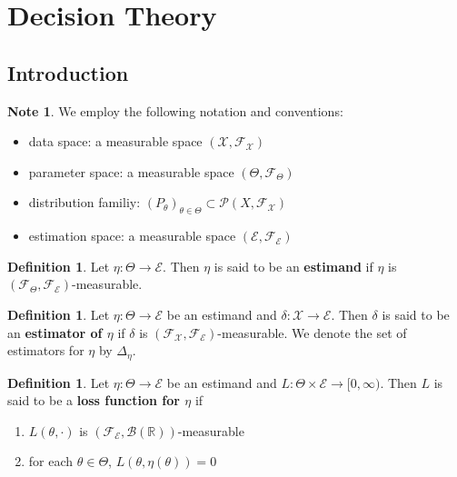 \documentclass[12pt]{amsart}
\theoremstyle{definition}
\newtheorem{defn}[definition]{Definition}
\newtheorem{note}[definition]{Note}
\newcommand{\del}{\delta}
\newcommand{\Del}{\Delta}
\newcommand{\R}{\mathbb{R}}
\newcommand{\MB}{\mathcal{B}}
\newcommand{\MF}{\mathcal{F}}
\newcommand{\MP}{\mathcal{P}}
\newcommand{\ME}{\mathcal{E}}
\newcommand{\MX}{\mathcal{X}}
\newcommand{\Rg}{[0,\infty)}
\begin{document}
	
	
	
	
	
	
	
	
	
	
	
	
	
	
	
	
	
	
	
	
	
	
	
		\newpage
	\section{Decision Theory}
	
	\subsection{Introduction}
	
	\begin{note} We employ the following notation and conventions:
		\begin{itemize}
			\item data space: a measurable space $(\MX, \MF_{\MX})$
			\item parameter space: a measurable space $(\Theta, \MF_{\Theta})$
			\item distribution familiy: $(P_{\theta})_{\theta \in \Theta} \subset \MP(X, \MF_{\MX})$
			\item estimation space: a measurable space $(\ME, \MF_{\ME})$
		\end{itemize}
	\end{note}

	\begin{defn}
		Let $\eta: \Theta \rightarrow \ME$. Then $\eta$ is said to be an \textbf{estimand} if $\eta$ is $(\MF_{\Theta}, \MF_{\ME})$-measurable. 
	\end{defn}
	
	\begin{defn}
		Let $\eta: \Theta \rightarrow \ME$ be an estimand and $\del: \MX \rightarrow \ME$. Then $\del$ is said to be an \textbf{estimator of $\eta$} if $\del$ is $(\MF_{\MX}, \MF_{\ME})$-measurable. We denote the set of estimators for $\eta$ by $\Del_{\eta}$.
	\end{defn}
	
	\begin{defn}
		Let $\eta: \Theta \rightarrow \ME$ be an estimand and $L: \Theta \times \ME \rightarrow \Rg$. Then $L$ is said to be a \textbf{loss function for $\eta$} if 
		\begin{enumerate}
			\item $L(\theta, \cdot)$ is $(\MF_{\ME}, \MB(\R))$-measurable
			\item for each $\theta \in \Theta$, $L(\theta, \eta(\theta)) = 0 $
		\end{enumerate}
	\end{defn}
	
\end{document}
